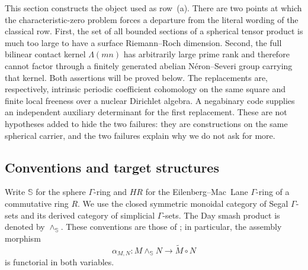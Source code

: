 \documentclass[11pt]{amsart}
\theoremstyle{definition}
\theoremstyle{remark}
\begin{document}
This section constructs the object used as row~(a).  There are two points at
which the characteristic-zero problem forces a departure from the literal
wording of the classical row.  First, the set of all bounded sections of a
spherical tensor product is much too large to have a surface
Riemann--Roch dimension.  Second, the full bilinear contact kernel
$\Lambda(mn)$ has arbitrarily large prime rank and therefore cannot factor
through a finitely generated abelian N\'eron--Severi group carrying that
kernel.  Both assertions will be proved below.  The
replacements are, respectively, intrinsic periodic coefficient cohomology
on the same square and finite local freeness over a nuclear Dirichlet
algebra.  A negabinary code supplies an independent auxiliary determinant
for the first replacement.  These are
not hypotheses added to hide the two failures: they are constructions on the
same spherical carrier, and the two failures explain why we do not ask for more.

\subsection{Conventions and target structures}

Write $\mathbb S$ for the sphere $\Gamma$-ring and $HR$ for the
Eilenberg--Mac~Lane $\Gamma$-ring of a commutative ring $R$.  We use the
closed symmetric monoidal category of Segal $\Gamma$-sets and its derived
category of simplicial $\Gamma$-sets.  The Day smash product is denoted by
$\wedge_{\mathbb S}$.  These conventions are those of
\cite[\S\S2,7]{CC-AbsoluteAlgebra}; in particular, the assembly morphism
\begin{equation}\label{eq:assembly}
 \alpha_{M,N}:M\wedge_{\mathbb S}N\longrightarrow \widetilde M\circ N
\end{equation}
is functorial in both variables.
\end{document}
